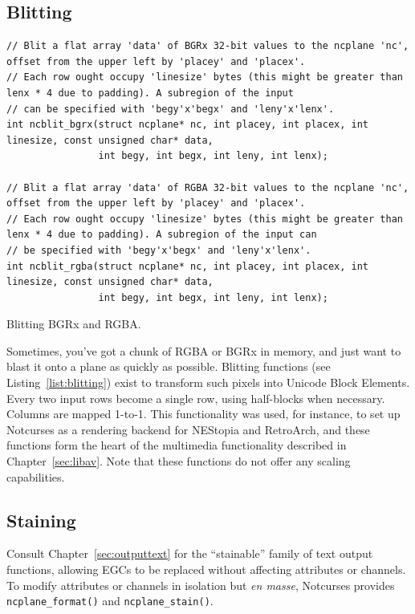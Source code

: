 \documentclass[letterpaper,10pt]{article}
\begin{document}
\subsection{Blitting}
\label{sec:blitting}
\begin{listing}[!htb]
\begin{verbatim}
// Blit a flat array 'data' of BGRx 32-bit values to the ncplane 'nc', offset from the upper left by 'placey' and 'placex'.
// Each row ought occupy 'linesize' bytes (this might be greater than lenx * 4 due to padding). A subregion of the input
// can be specified with 'begy'x'begx' and 'leny'x'lenx'.
int ncblit_bgrx(struct ncplane* nc, int placey, int placex, int linesize, const unsigned char* data,
                int begy, int begx, int leny, int lenx);

// Blit a flat array 'data' of RGBA 32-bit values to the ncplane 'nc', offset from the upper left by 'placey' and 'placex'.
// Each row ought occupy 'linesize' bytes (this might be greater than lenx * 4 due to padding). A subregion of the input can
// be specified with 'begy'x'begx' and 'leny'x'lenx'.
int ncblit_rgba(struct ncplane* nc, int placey, int placex, int linesize, const unsigned char* data,
                int begy, int begx, int leny, int lenx);
\end{verbatim}
\caption{Blitting BGRx and RGBA.}
\label{list:blitting}
\end{listing}

Sometimes, you've got a chunk of RGBA or BGRx in memory, and just want to blast
it onto a plane as quickly as possible. Blitting functions (see Listing~\ref{list:blitting})
exist to transform such pixels into Unicode Block Elements. Every two input rows
become a single row, using half-blocks when necessary. Columns are mapped 1-to-1.
This functionality was used, for instance, to set up Notcurses as a rendering
backend for NEStopia and RetroArch, and these functions form the heart of the
multimedia functionality described in Chapter~\ref{sec:libav}. Note that these
functions do not offer any scaling capabilities.

\subsection{Staining}
\label{sec:staining}
Consult Chapter~\ref{sec:outputtext} for the ``stainable'' family of text output
functions, allowing EGCs to be replaced without affecting attributes or channels.
To modify attributes or channels in isolation but \textit{en masse}, Notcurses
provides \texttt{ncplane\_format()} and \texttt{ncplane\_stain()}.
\end{document}
